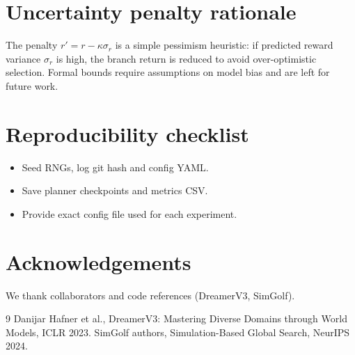 \documentclass{article}
\begin{document}
\section{Uncertainty penalty rationale}
The penalty \(r' = r - \kappa\sigma_r\) is a simple pessimism heuristic: if
predicted reward variance \(\sigma_r\) is high, the branch return is reduced to
avoid over-optimistic selection. Formal bounds require assumptions on model bias
and are left for future work.

\section{Reproducibility checklist}
\begin{itemize}
\item Seed RNGs, log git hash and config YAML.
\item Save planner checkpoints and metrics CSV.
\item Provide exact config file used for each experiment.
\end{itemize}

\section*{Acknowledgements}
We thank collaborators and code references (DreamerV3, SimGolf).


\begin{thebibliography}{9}
Danijar Hafner et al., DreamerV3: Mastering Diverse Domains through World Models, ICLR 2023.
SimGolf authors, Simulation-Based Global Search, NeurIPS 2024.
\end{thebibliography}
\end{document}
